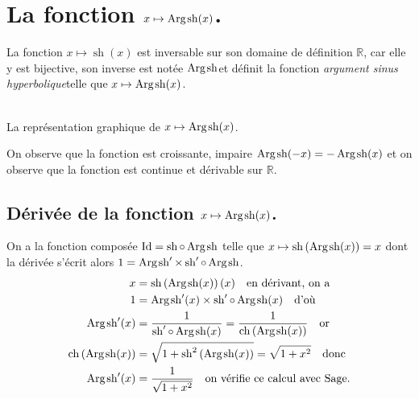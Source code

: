 \documentclass[a4paper,12pt]{report}
\def\eclaire{\mathbb}
\def\R{\ensuremath{\eclaire R}}
\def\Id{\ensuremath{\mathrm{Id}}}
\renewcommand{\sinh}{\mathop{\mathrm{sh}}}
\renewcommand{\cosh}{\mathop{\mathrm{ch}}}
\renewcommand{\arg}{\mathop{\mathrm{Arg}}}
\begin{document}
\section{La fonction  $x \mapsto \arg\mspace{-1mu}\sinh(x)$.}

La fonction $x \mapsto \sinh(x)$ est inversable sur son domaine de définition $\R$, car elle y est bijective, son inverse est notée \og$ \arg\mspace{-1mu}\sinh $\fg et définit la fonction \og\emph{argument sinus hyperbolique}\fg telle que $x \mapsto \arg\mspace{-1mu}\sinh(x)$.


\begin{center}
 \\
La représentation graphique de $x \mapsto \arg\mspace{-1mu}\sinh(x)$.
\end{center}
On observe que la fonction est croissante, impaire $\arg\mspace{-1mu}\sinh(-x) = -\arg\mspace{-1mu}\sinh(x) $
et on observe que la fonction est continue et dérivable sur $\R$.                                                                                                             

\subsection{Dérivée de la fonction $x \mapsto \arg\mspace{-1mu}\sinh(x)$.}
On a la fonction composée $\Id = \sinh \circ \arg\mspace{-1mu}\sinh$ telle que $x\mapsto\sinh\left(\arg\mspace{-1mu}\sinh(x)\right)=x$ dont la dérivée s'écrit alors $1= \arg\mspace{-1mu}\sinh\nolimits' \times \sinh\nolimits'\circ\arg\mspace{-1mu}\sinh$.
\begin{align*}
x & =\sinh\left(\arg\mspace{-1mu}\sinh(x)\right)(x) \quad \textrm{en dérivant, on a}\\
1 & = \arg\mspace{-1mu}\sinh\nolimits'(x) \times \sinh\nolimits'\circ\arg\mspace{-1mu}\sinh(x) \quad \textrm{d'où}\\
\arg\mspace{-1mu}\sinh\nolimits'(x) & =\frac{1}{ \sinh\nolimits'\circ\arg\mspace{-1mu}\sinh(x)}=\frac{1}{ \cosh\left(\arg\mspace{-1mu}\sinh(x)\right)}\quad \textrm{or}\\
\cosh\left(\arg\mspace{-1mu}\sinh(x)\right) & = \sqrt{1+\sinh\nolimits^2\left(\arg\mspace{-1mu}\sinh(x)\right)}=\sqrt{1+x^2}\quad \textrm{donc}\\
\arg\mspace{-1mu}\sinh\nolimits'(x) & = \frac{1}{ \sqrt{1+x^2}}\quad \textrm{on vérifie ce calcul avec Sage.}
\end{align*}
\end{document}
